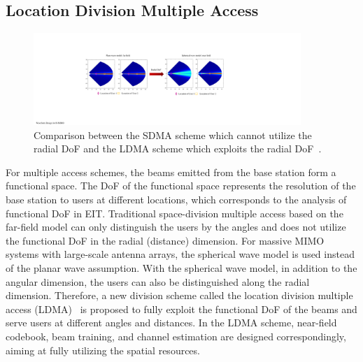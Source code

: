\documentclass[journal,twocolumn]{IEEEtran}
\begin{document}

\subsection{Location Division Multiple Access}
\begin{figure}[t]
	\centering 
	\includegraphics[width=0.9\textwidth]{figures/LDMA.pdf} 
	\caption{Comparison between the SDMA scheme which cannot utilize the radial DoF and the LDMA scheme which exploits the radial DoF~\cite{wu2022multiple}. }
	\label{fig:LDMA}
\end{figure}
For multiple access schemes, the beams emitted from the base station form a functional space. 
The DoF of the functional space represents the resolution of the base station to users at different locations, which corresponds to the analysis of functional DoF in EIT. 	%
Traditional space-division multiple access based on the far-field model can only distinguish the users by the angles and does not utilize the functional DoF in the radial (distance) dimension. 
For massive MIMO systems with large-scale antenna arrays, the spherical wave model is used instead of the planar wave assumption. 
With the spherical wave model, in addition to the angular dimension, the users can also be distinguished along the radial dimension. 
Therefore, a new division scheme called the location division multiple access (LDMA)~\cite{wu2022multiple} is proposed to fully exploit the functional DoF of the beams and serve users at different angles and distances. 
In the LDMA scheme, near-field codebook, beam training, and channel estimation are designed correspondingly, aiming at fully utilizing the spatial resources. 
\end{document}
